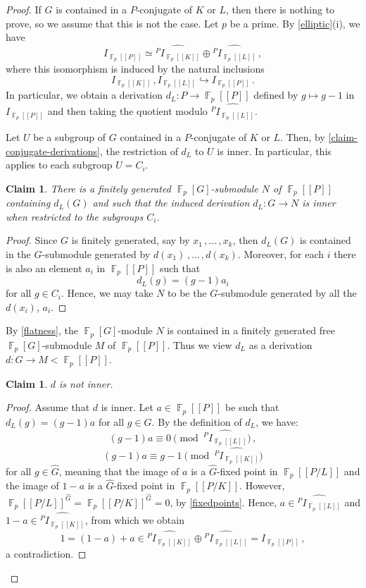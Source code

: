 \documentclass[a4paper]{amsart}
\newtheorem{claim}[lem]{Claim}
\theoremstyle{definition}
\theoremstyle{remark}
\DeclareMathOperator{\bbf}{\mathbb{F}}
\newcommand{\Falgebra}[1]{\bbf_p[#1]}
\newcommand{\FFalgebra}[1]{\bbf_p[\![#1]\!]}
\begin{document}
\begin{proof} If \(G\) is contained in a \(P\)-conjugate of \(K\) or \(L\), then there is nothing to prove, so we assume that this is not the case. Let \(p\) be a prime. By \cref{elliptic}(i), we have \[I_{\FFalgebra{P}} \simeq \widehat{^PI_{\FFalgebra{K}}} \oplus \widehat{^PI_{\FFalgebra{L}}}\,,\] where this isomorphism is induced by the natural inclusions
\[I_{\FFalgebra{K}}\,, I_{\FFalgebra{L}} \hookrightarrow I_{\FFalgebra{P}}\,.\]
In particular, we obtain a derivation \(d_L\colon P \to \FFalgebra{P}\) defined by \(g \mapsto g-1\) in \(I_{\FFalgebra{P}}\) and then taking the quotient modulo \(\widehat{^PI_{\FFalgebra{L}}}\).

Let \(U\) be a subgroup of \(G\) contained in a \(P\)-conjugate of \(K\) or \(L\). Then, by \cref{claim-conjugate-derivations}, the restriction of \(d_L\) to \(U\) is inner. In particular, this applies to  each  subgroup  \(U = C_i\).

\begin{claim} There is a finitely generated \(\Falgebra{G}\)-submodule \(N\) of \(\FFalgebra{P}\) containing \(d_L(G)\) and such that the induced derivation \(d_L\colon  G \to N\) is inner when restricted to the subgroups \(C_i\).
\end{claim}
\begin{proof}
Since \(G\) is finitely generated, say by \(x_1\,,\ldots\,,x_k\), then \(d_L(G)\) is contained in the \(G\)-submodule generated by \(d(x_1)\,,\ldots\,,d(x_k)\). Moreover, for each \(i\) there is also an element \(a_i\) in \(\FFalgebra{P}\) such that \[d_L(g) = (g-1)a_i\] for all \(g \in C_i\). Hence, we may take \(N\) to be the \(G\)-submodule generated by all the \(d(x_i)\), \(a_i\).
\end{proof}

By  \cref{flatness}, the \(\Falgebra{G}\)-module \(N\) is contained in a finitely generated free \(\Falgebra{G}\)-submodule \(M\) of \(\FFalgebra{P}\). Thus we view \(d_L\) as a derivation \(d\colon G \to M< \FFalgebra{P}\).

\begin{claim}\label{claim-d-not-inner} \(d\) is not inner.
\end{claim} 
\begin{proof} 
Assume that \(d\) is inner. Let \(a \in \FFalgebra{P}\) be such that \(d_L(g) = (g-1)a\) for all \(g \in G\). By the definition of \(d_L\), we have:
\[(g-1)a \equiv 0 \pmod{\widehat{^{P}I_{\FFalgebra{L}}}}\,,\]
\[(g-1)a \equiv g-1 \pmod{\widehat{^{P}I_{\FFalgebra{K}}}}\] for all \(g \in \widehat{G}\), meaning that the image of \(a\) is a \(\widehat{G}\)-fixed point in \(\FFalgebra{P/L}\) and the image of \(1-a\) is a \(\widehat{G}\)-fixed point in \(\FFalgebra{P/K}\). However, \(\FFalgebra{P/L}^{\widehat{G}}= \FFalgebra{P/K}^{\widehat{G}} = 0\),   by \cref{fixedpoints}. Hence, \(a \in \widehat{^{P}I_{\FFalgebra{L}}}\) and \(1-a \in \widehat{^{P}I_{\FFalgebra{K}}}\), from which we obtain \[1 = (1-a)+a \in \widehat{^{P}I_{\FFalgebra{K}}} \oplus \widehat{^{P}I_{\FFalgebra{L}}} = I_{\FFalgebra{P}}\,,\] a contradiction.
\end{proof}


\end{proof}
\end{document}
